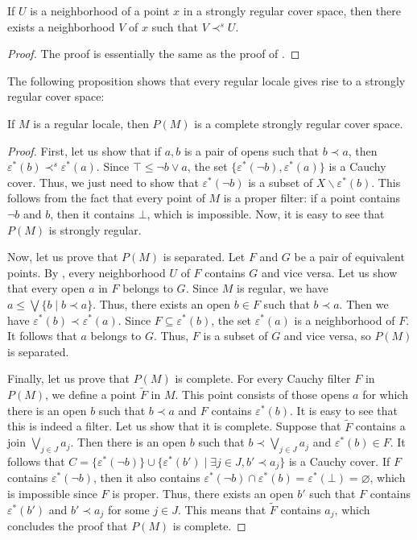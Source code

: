 \documentclass[reqno]{amsart}
\theoremstyle{definition}
\theoremstyle{remark}
\numberwithin{figure}{section}
\newcommand{\rb}{\prec}
\begin{document}
\begin{lem}
If $U$ is a neighborhood of a point $x$ in a strongly regular cover space, then there exists a neighborhood $V$ of $x$ such that $V \rb^s U$.
\end{lem}
\begin{proof}
The proof is essentially the same as the proof of .
\end{proof}

The following proposition shows that every regular locale gives rise to a strongly regular cover space:

\begin{prop}
If $M$ is a regular locale, then $P(M)$ is a complete strongly regular cover space.
\end{prop}
\begin{proof}
First, let us show that if $a,b$ is a pair of opens such that $b \rb a$, then $\varepsilon^*(b) \rb^s \varepsilon^*(a)$.
Since $\top \leq \neg b \vee a$, the set $\{ \varepsilon^*(\neg b), \varepsilon^*(a) \}$ is a Cauchy cover.
Thus, we just need to show that $\varepsilon^*(\neg b)$ is a subset of $X \backslash \varepsilon^*(b)$.
This follows from the fact that every point of $M$ is a proper filter: if a point contains $\neg b$ and $b$, then it contains $\bot$, which is impossible.
Now, it is easy to see that $P(M)$ is strongly regular.

Now, let us prove that $P(M)$ is separated.
Let $F$ and $G$ be a pair of equivalent points.
By , every neighborhood $U$ of $F$ contains $G$ and vice versa.
Let us show that every open $a$ in $F$ belongs to $G$.
Since $M$ is regular, we have $a \leq \bigvee \{ b \mid b \rb a \}$.
Thus, there exists an open $b \in F$ such that $b \rb a$.
Then we have $\varepsilon^*(b) \rb \varepsilon^*(a)$.
Since $F \subseteq \varepsilon^*(b)$, the set $\varepsilon^*(a)$ is a neighborhood of $F$.
It follows that $a$ belongs to $G$.
Thus, $F$ is a subset of $G$ and vice versa, so $P(M)$ is separated.

Finally, let us prove that $P(M)$ is complete.
For every Cauchy filter $F$ in $P(M)$, we define a point $\widetilde{F}$ in $M$.
This point consists of those opens $a$ for which there is an open $b$ such that $b \rb a$ and $F$ contains $\varepsilon^*(b)$.
It is easy to see that this is indeed a filter.
Let us show that it is complete.
Suppose that $\widetilde{F}$ contains a join $\bigvee_{j \in J} a_j$.
Then there is an open $b$ such that $b \rb \bigvee_{j \in J} a_j$ and $\varepsilon^*(b) \in F$.
It follows that $C = \{ \varepsilon^*(\neg b) \} \cup \{ \varepsilon^*(b') \mid \exists j \in J, b' \rb a_j \}$ is a Cauchy cover.
If $F$ contains $\varepsilon^*(\neg b)$, then it also contains $\varepsilon^*(\neg b) \cap \varepsilon^*(b) = \varepsilon^*(\bot) = \varnothing$, which is impossible since $F$ is proper.
Thus, there exists an open $b'$ such that $F$ contains $\varepsilon^*(b')$ and $b' \rb a_j$ for some $j \in J$.
This means that $\widetilde{F}$ contains $a_j$, which concludes the proof that $P(M)$ is complete.
\end{proof}
\end{document}
